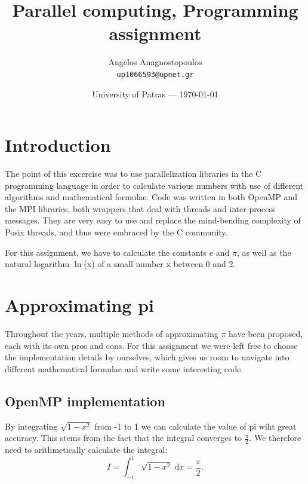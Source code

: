\documentclass{article}
\title{Parallel computing, Programming assignment} %
\author{Angelos Anagnostopoulos\\ \texttt{up1066593@upnet.gr}} %
\date{University of Patras --- \today} %
\begin{document}
\maketitle %


\section*{Introduction} %

The point of this excercise was to use parallelization libraries in the C programming language in order to calculate various numbers with use of different algorithms and mathematical formulae. 
Code was written in both OpenMP and the MPI libraries, both wrappers that deal with threads and inter-process messages. 
They are very easy to use and replace the mind-bending complexity of Posix threads, and thus were embraced by the C community. 

For this assignment, we have to calculate the constants e and $ \pi $, as well as the natural logarithm $ \ln $(x) of a small number x between 0 and 2.


\section{Approximating pi} %

Throughout the years, multiple methods of approximating $ \pi $ have been proposed, each with its own pros and cons.
For this assignment we were left free to choose the implementation details by ourselves,
which gives us room to navigate into different mathematical formulae and write some interesting code.

\subsection{OpenMP implementation}

By integrating $ \sqrt{1-x^2}	$ from -1 to 1 we can calculate the value of pi wiht great accuracy.
This stems from the fact that the integral converges to $ \frac{\pi}{2} $. We therefore need to arithmetically calculate the integral:
\begin{equation}
	I = \int_{-1}^{1} \sqrt{1-x^2} \; \text{d}x = \frac{\pi}{2}.
\end{equation}
\end{document}
